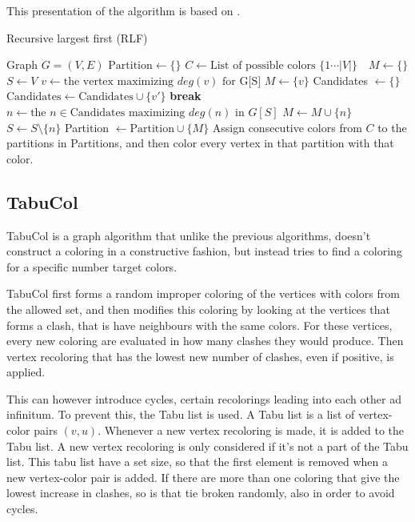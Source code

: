 \documentclass{amsart}
\newcommand{\algorithmicbreak}{\textbf{break}}
\newcommand{\BREAK}{\STATE \algorithmicbreak}
\begin{document}
This presentation of the algorithm is based on \cite{Constructive}.
\begin{algorithm}[H]
    \caption{Recursive largest first (RLF)}
  \begin{algorithmic}[1]
      \REQUIRE Graph $G = (V,E)$
      \STATE $\text{Partition} \leftarrow \{\}$
      \STATE $C \leftarrow \text{List of possible colors $\{1 \cdots |V| \}$ }$
      \STATE $M \leftarrow \{\}$
      \STATE $S \leftarrow V$
        \STATE $v \leftarrow \text{the vertex maximizing $deg(v)$ for G[S]} $
        \STATE $M \leftarrow \{v\}$
            \STATE Candidates $\leftarrow \{\}$
                    \STATE $\text{Candidates} \leftarrow \text{Candidates}
                    \cup \{v'\}$
                \ENDIF
            \ENDFOR
                \BREAK
            \ENDIF
            \STATE $n \leftarrow \text{the $n \in \text{Candidates}$ maximizing $deg(n)$ in $G[S]$}$ 
            \STATE $M \leftarrow M \cup \{n\}$
            \STATE $S \leftarrow S \setminus \{n\}$
        \ENDWHILE
        \STATE Partition $\leftarrow \text{Partition} \cup \{M\}$ 
      \ENDWHILE
      \STATE Assign consecutive colors from $C$ to the partitions in Partitions,
      and then color every vertex in that partition with that color.
  \end{algorithmic}
\end{algorithm}

\subsection{TabuCol}

TabuCol is a graph algorithm that unlike the previous algorithms, doesn't
construct a coloring in a constructive fashion, but instead tries to find a
coloring for a specific number target colors.

TabuCol first forms a random improper coloring of the vertices with colors
from the allowed set, and then modifies this coloring by looking at the
vertices that forms a clash, that is have neighbours with the same colors. For
these vertices, every new coloring are evaluated in how many clashes they would
produce. Then vertex recoloring that has the lowest new number of clashes, even
if positive, is applied.

This can however introduce cycles, certain recolorings leading into each other
ad infinitum. To prevent this, the Tabu list is used. A Tabu list is a list of
vertex-color pairs $(v,u)$. Whenever a new vertex recoloring is made, it is
added to the Tabu list. A new vertex recoloring is only considered if it's not a
part of the Tabu list. This tabu list have a set size, so that the first element
is removed when a new vertex-color pair is added. If there are more than one
coloring that give the lowest increase in clashes, so is that tie broken
randomly, also in order to avoid cycles.
\end{document}
